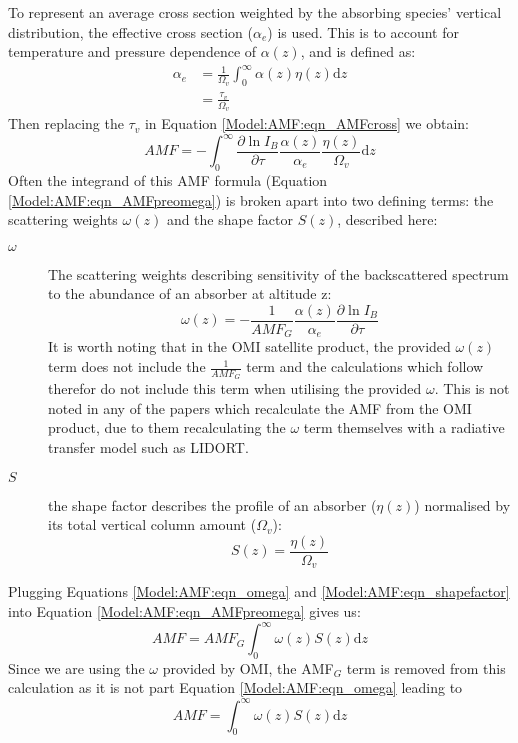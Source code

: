   To represent an average cross section weighted by the absorbing species' vertical distribution, the effective cross section ($\alpha_e$) is used.
  This is to account for temperature and pressure dependence of $\alpha(z)$, and is defined as:
  \begin{align*}
    \alpha_e &= \frac{1}{\Omega_v} \int_0^\infty \alpha(z) \eta(z) \mathrm{d}z \\
     &= \frac{\tau_v}{\Omega_v}
  \end{align*}
  Then replacing the $\tau_v$ in Equation \ref{Model:AMF:eqn_AMFcross} we obtain:
  \begin{equation} \label{Model:AMF:eqn_AMFpreomega}
    AMF=-\int_0^\infty{ \frac{\partial \ln{I_B}}{\partial \tau} \frac{\alpha(z)}{\alpha_e} \frac{\eta(z)}{\Omega_v} \mathrm{d}z }
  \end{equation}
  Often the integrand of this AMF formula (Equation \ref{Model:AMF:eqn_AMFpreomega}) is broken apart into two defining terms: the scattering weights $\omega(z)$ and the shape factor $S(z)$, described here:
  \begin{description}
    \item[$\omega$] The scattering weights describing sensitivity of the backscattered spectrum to the abundance of an absorber at altitude z:
    \begin{equation} \label{Model:AMF:eqn_omega}
      \omega(z) = -\frac{1}{AMF_G} \frac{\alpha(z)}{\alpha_e} \frac{\partial \ln{I_B}}{\partial \tau}
    \end{equation}
    It is worth noting that in the OMI satellite product, the provided $\omega(z)$ term does not include the $\frac{1}{AMF_G}$ term and the calculations which follow therefor do not include this term when utilising the provided $\omega$.
    This is not noted in any of the papers which recalculate the AMF from the OMI product, due to them recalculating the $\omega$ term themselves with a radiative transfer model such as LIDORT.
    \item[$S$] the shape factor describes the profile of an absorber ($\eta(z)$) normalised by its total vertical column amount ($\Omega_v$):
    \begin{equation} \label{Model:AMF:eqn_shapefactor}
      S(z) = \frac{\eta(z)}{\Omega_v}
    \end{equation}
  \end{description}
  
  Plugging Equations \ref{Model:AMF:eqn_omega} and \ref{Model:AMF:eqn_shapefactor} into Equation \ref{Model:AMF:eqn_AMFpreomega} gives us:
  \begin{equation} \label{Model:AMF:eqn_AMF_amfgintwSdz}
    AMF = AMF_G\int_0^\infty{ \omega(z) S(z) \mathrm{d}z}
  \end{equation}
  Since we are using the $\omega$ provided by OMI, the AMF$_G$ term is removed from this calculation as it is not part Equation \ref{Model:AMF:eqn_omega} leading to 
  \begin{equation} \label{Model:AMF:eqn_AMF_intwSdz}
    AMF = \int_0^\infty{ \omega(z) S(z) \mathrm{d}z}
  \end{equation}
  
